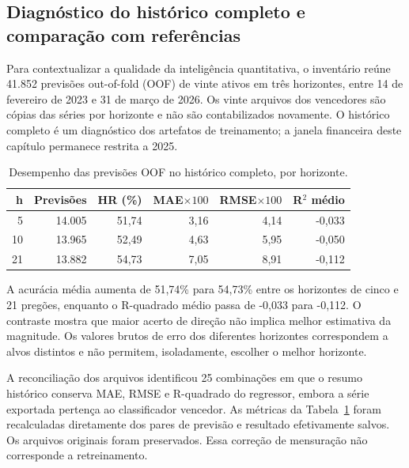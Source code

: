 \subsection{Diagnóstico do histórico completo e comparação com referências}

Para contextualizar a qualidade da inteligência quantitativa, o inventário reúne 41.852 previsões out-of-fold (OOF) de vinte ativos em três horizontes, entre 14 de fevereiro de 2023 e 31 de março de 2026. Os vinte arquivos dos vencedores são cópias das séries por horizonte e não são contabilizados novamente. O histórico completo é um diagnóstico dos artefatos de treinamento; a janela financeira deste capítulo permanece restrita a 2025.

\begin{table}[H]\centering
\caption{Desempenho das previsões OOF no histórico completo, por horizonte.}
\label{tab:xgb_historico_completo}
{\footnotesize\setlength{\tabcolsep}{4pt}\begin{tabular}{rrrrrr}\hline
h & Previsões & HR (\%) & MAE$\times100$ & RMSE$\times100$ & R$^2$ médio\\ \hline
5 & 14.005 & 51,74 & 3,16 & 4,14 & -0,033\\
10 & 13.965 & 52,49 & 4,63 & 5,95 & -0,050\\
21 & 13.882 & 54,73 & 7,05 & 8,91 & -0,112\\
\hline\end{tabular}}
\par{}
\end{table}

A acurácia média aumenta de 51,74\% para 54,73\% entre os horizontes de cinco e 21 pregões, enquanto o R-quadrado médio passa de -0,033 para -0,112. O contraste mostra que maior acerto de direção não implica melhor estimativa da magnitude. Os valores brutos de erro dos diferentes horizontes correspondem a alvos distintos e não permitem, isoladamente, escolher o melhor horizonte.

A reconciliação dos arquivos identificou 25 combinações em que o resumo histórico conserva MAE, RMSE e R-quadrado do regressor, embora a série exportada pertença ao classificador vencedor. As métricas da Tabela~\ref{tab:xgb_historico_completo} foram recalculadas diretamente dos pares de previsão e resultado efetivamente salvos. Os arquivos originais foram preservados. Essa correção de mensuração não corresponde a retreinamento.

